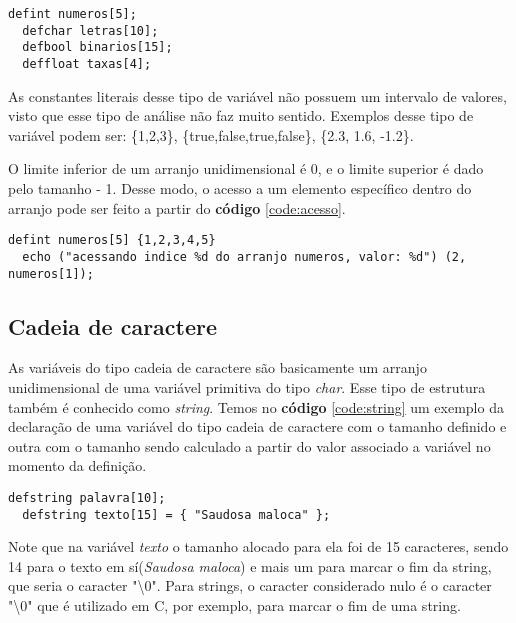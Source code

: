 \documentclass[
  12pt,				%
  oneside,			%
  a4paper,			%
  english,			%
  french,				%
  spanish,			%
  brazil,				%
]{abntex2}
\begin{document}
\begin{lstlisting}[label=code:arranjos-unidimensionais,caption=Declaração
    de uma variável do tipo arranjo unidimensional.]
  defint numeros[5];
  defchar letras[10];
  defbool binarios[15];
  deffloat taxas[4];
\end{lstlisting}

As constantes literais desse tipo de variável não possuem um intervalo
de valores, visto que esse tipo de análise não faz muito
sentido. Exemplos desse tipo de variável podem ser: \{1,2,3\},
\{true,false,true,false\}, \{2.3, 1.6, -1.2\}.

O limite inferior de um arranjo unidimensional é 0, e o limite
superior é dado pelo tamanho - 1. Desse modo, o acesso a um elemento
específico dentro do arranjo pode ser feito a partir do
\textbf{código} \ref{code:acesso}.

\begin{lstlisting}[label=code:acesso,caption=Acessando elemento dentro
    de um arranjo unidimensional]
  defint numeros[5] {1,2,3,4,5}
  echo ("acessando indice %d do arranjo numeros, valor: %d") (2, numeros[1]);
\end{lstlisting}


\subsection{Cadeia de caractere}
\label{subsec:cadeia-de-caractere}

As variáveis do tipo cadeia de caractere são basicamente um arranjo
unidimensional de uma variável primitiva do tipo \emph{char}. Esse
tipo de estrutura também é conhecido como \emph{string}. Temos no
\textbf{código} \ref{code:string} um exemplo da declaração de uma
variável do tipo cadeia de caractere com o tamanho definido e outra
com o tamanho sendo calculado a partir do valor associado a variável
no momento da definição.

\begin{lstlisting}[label=code:string,caption=Declaração de variáveis
    do tipo cadeia de caractere.]
  defstring palavra[10];
  defstring texto[15] = { "Saudosa maloca" };
\end{lstlisting}

Note que na variável \emph{texto} o tamanho alocado para ela foi de
15 caracteres, sendo 14 para o texto em sí(\emph{Saudosa maloca}) e
mais um para marcar o fim da string, que seria o caracter "\textbackslash0". Para
strings, o caracter considerado nulo é o caracter "\textbackslash0"
que é utilizado em C, por exemplo, para marcar o fim de uma string.
\end{document}
